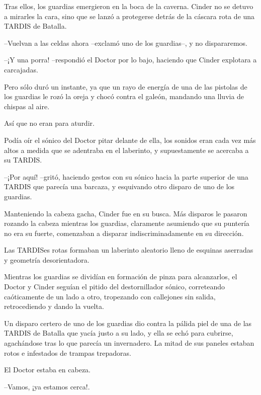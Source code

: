 Tras ellos, los guardias emergieron en la boca de la caverna. Cinder no se detuvo a mirarles la cara, sino que se lanzó a protegerse detrás de la cáscara rota de una TARDIS de Batalla.



--Vuelvan a las celdas ahora --exclamó uno de los guardias--, y no dispararemos.



--¡Y una porra! --respondió el Doctor por lo bajo, haciendo que Cinder explotara a carcajadas.



Pero sólo duró un instante, ya que un rayo de energía de una de las pistolas de los guardias le rozó la oreja y chocó contra el galeón, mandando una lluvia de chispas al aire.

Así que no eran para aturdir.

Podía oír el sónico del Doctor pitar delante de ella, los sonidos eran cada vez más altos a medida que se adentraba en el laberinto, y supuestamente se acercaba a su TARDIS.



--¡Por aquí! --gritó, haciendo gestos con su sónico hacia la parte superior de una TARDIS que parecía una barcaza, y esquivando otro disparo de uno de los guardias.



Manteniendo la cabeza gacha, Cinder fue en su busca. Más disparos le pasaron rozando la cabeza mientras los guardias, claramente asumiendo que su puntería no era su fuerte, comenzaban a disparar indiscriminadamente en su dirección.

Las TARDISes rotas formaban un laberinto aleatorio lleno de esquinas aserradas y geometría desorientadora.

Mientras los guardias se dividían en formación de pinza para alcanzarlos, el Doctor y Cinder seguían el pitido del destornillador sónico, correteando caóticamente de un lado a otro, tropezando con callejones sin salida, retrocediendo y dando la vuelta.

Un disparo certero de uno de los guardias dio contra la pálida piel de una de las TARDIS de Batalla que yacía justo a su lado, y ella se echó para cubrirse, agachándose tras lo que parecía un invernadero. La mitad de sus paneles estaban rotos e infestados de trampas trepadoras.

El Doctor estaba en cabeza.



--Vamos, ¡ya estamos cerca!.



